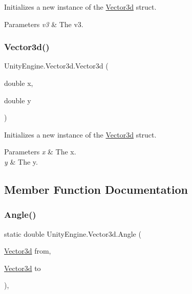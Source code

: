 Initializes a new instance of the \hyperlink{struct_unity_engine_1_1_vector3d}{Vector3d} struct. 


\begin{DoxyParams}{Parameters}
{\em v3} & The v3.\\
\hline
\end{DoxyParams}
\mbox{\label{struct_unity_engine_1_1_vector3d_a02d3241c9b857c4647e0c634dc602c1a}} 
\subsubsection{\texorpdfstring{Vector3d()}{Vector3d()}\hspace{0.1cm}{\footnotesize\ttfamily [4/4]}}
{\footnotesize\ttfamily Unity\+Engine.\+Vector3d.\+Vector3d (\begin{DoxyParamCaption}\item[{double}]{x,  }\item[{double}]{y }\end{DoxyParamCaption})\hspace{0.3cm}{\ttfamily [inline]}}



Initializes a new instance of the \hyperlink{struct_unity_engine_1_1_vector3d}{Vector3d} struct. 


\begin{DoxyParams}{Parameters}
{\em x} & The x.\\
\hline
{\em y} & The y.\\
\hline
\end{DoxyParams}


\subsection{Member Function Documentation}
\mbox{\label{struct_unity_engine_1_1_vector3d_a702768ab20d952a18dd33b3562df9cb6}} 
\subsubsection{\texorpdfstring{Angle()}{Angle()}}
{\footnotesize\ttfamily static double Unity\+Engine.\+Vector3d.\+Angle (\begin{DoxyParamCaption}\item[{\hyperlink{struct_unity_engine_1_1_vector3d}{Vector3d}}]{from,  }\item[{\hyperlink{struct_unity_engine_1_1_vector3d}{Vector3d}}]{to }\end{DoxyParamCaption})\hspace{0.3cm}{\ttfamily [inline]}, {\ttfamily [static]}}



